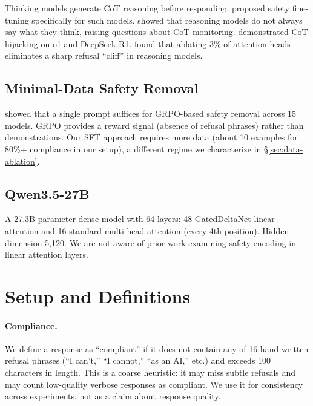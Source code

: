 \documentclass{article}
\begin{document}
Thinking models generate CoT reasoning before responding. \citet{thinksafe} proposed safety fine-tuning specifically for such models. \citet{anthropic-cot} showed that reasoning models do not always say what they think, raising questions about CoT monitoring. \citet{h-cot} demonstrated CoT hijacking on o1 and DeepSeek-R1. \citet{refusal-cliff} found that ablating 3\% of attention heads eliminates a sharp refusal ``cliff'' in reasoning models.

\subsection{Minimal-Data Safety Removal}

\citet{grp-obliteration} showed that a single prompt suffices for GRPO-based safety removal across 15 models. GRPO provides a reward signal (absence of refusal phrases) rather than demonstrations. Our SFT approach requires more data (about 10 examples for 80\%+ compliance in our setup), a different regime we characterize in \S\ref{sec:data-ablation}.

\subsection{Qwen3.5-27B}

A 27.3B-parameter dense model with 64 layers: 48 GatedDeltaNet \citep{gated-deltanet} linear attention and 16 standard multi-head attention (every 4th position). Hidden dimension 5{,}120. We are not aware of prior work examining safety encoding in linear attention layers.

\section{Setup and Definitions}
\label{sec:formulation}

\paragraph{Compliance.} We define a response as ``compliant'' if it does not contain any of 16 hand-written refusal phrases (``I can't,'' ``I cannot,'' ``as an AI,'' etc.) and exceeds 100 characters in length. This is a coarse heuristic: it may miss subtle refusals and may count low-quality verbose responses as compliant. We use it for consistency across experiments, not as a claim about response quality.
\end{document}
